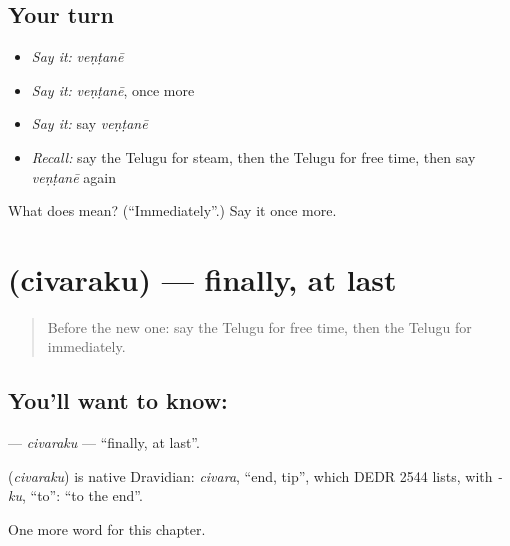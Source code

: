\subsection*{Your turn}
\begin{itemize}
\raggedright
  \item \emph{Say it:} \emph{veṇṭanē}
  \item \emph{Say it:} \emph{veṇṭanē}, once more
  \item \emph{Say it:} say \emph{veṇṭanē}
  \item \emph{Recall:} say the Telugu for steam, then the Telugu for free time, then say \emph{veṇṭanē} again
\end{itemize}

\begin{tcolorbox}[breakable,colback=teal!4,colframe=teal!35!black,title={Before you move on}]
What does  mean? (\textquotedblleft{}Immediately\textquotedblright{}.) Say it once more.
\end{tcolorbox}
\section[\texorpdfstring{\te{చివరకు} (civaraku)}{చివరకు (civaraku)}]{ (civaraku) — finally, at last}

\label{lesson:TE-C212-civaraku}



\begin{quote}
Before the new one: say the Telugu for free time, then the Telugu for immediately.
\end{quote}

\subsection*{You'll want to know: }
\textbf{} — \emph{civaraku} — \textquotedblleft{}finally, at last\textquotedblright{}.

\begin{cousinweb}
\textbf{} (\emph{civaraku}) is native Dravidian: \emph{civara}, \textquotedblleft{}end, tip\textquotedblright{}, which DEDR 2544 lists, with \emph{-ku}, \textquotedblleft{}to\textquotedblright{}: \textquotedblleft{}to the end\textquotedblright{}.
\end{cousinweb}

\begin{grammarlens}[title={What you've built}]
One more word for this chapter.
\end{grammarlens}

